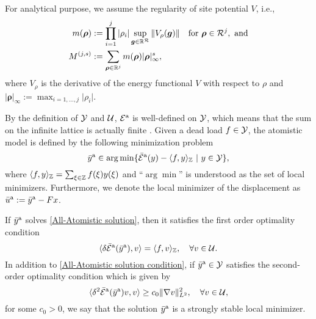 For analytical purpose, we assume the regularity of site potential $V$, i.e.,
\begin{align*}
		m(\bm{\rho})&:= \prod_{i =1}^{j} \vert \rho_{i} \vert \sup_{\bm{g} \in \mathbb{R}^{\mathcal{R}}} \Vert V_{\rho}(\bm{g}) \Vert \quad \text{for} \ \bm{\rho} \in \mathcal{R}^{j}, \ \text{and} \\
		M^{(j,s)}&:= \sum_{\bm{\rho} \in \mathbb{R}^{j} } m(\bm{\rho}) \vert \bm{\rho} \vert^{s}_{\infty},
\end{align*}
where $V_\rho$ is the derivative of the energy functional $V$ with respect to $\rho$ and $\vert \bm{\rho} \vert_{\infty}:=\max_{i= 1,\dots,j}\vert \rho_{i} \vert$.

By the definition of $\mathcal{Y}$ and $\mathcal{U}$, $\mathcal{E}^{{\rm a}}$ is well-defined on $\mathcal{Y}$, which means that the sum on the infinite lattice is actually finite \cite[Proposition 3.7]{2013_ML_CO_AC_Coupling_ACTANUM}. Given a dead load $f \in \mathcal{Y}$, the atomistic model is defined by the following minimization problem 
\begin{equation}\label{All-Atomistic solution}
	\bar{y}^{{\rm a}} \in \arg \min\{\bar{\mathcal{E}}^{{\rm a}}(y) -\langle f,y\rangle_{\mathbb{Z}}\ | \ y \in \mathcal{Y}\},
\end{equation}
where $\langle f,y\rangle_{\mathbb{Z}} = \sum_{\xi \in \mathbb{Z}} f(\xi)y(\xi)$ and ``$\arg\min$'' is understood as the set of local minimizers. Furthermore, we denote the local minimizer of the displacement as $\bar{u}^{\rm a}:=\bar{y}^{\rm a}-Fx$. 

If $\bar{y}^{{\rm a}}$ solves \eqref{All-Atomistic solution}, then it satisfies the first order optimality condition 
\begin{equation}\label{All-Atomistic solution condition}
	\langle \delta \bar{\mathcal{E}}^{{\rm a}}(\bar{y}^{{\rm a}}),v \rangle = \langle f,v\rangle_{\mathbb{Z}}, \quad \forall v \in \mathcal{U}.
\end{equation}
In addition to \eqref{All-Atomistic solution condition}, if $\bar{y}^{{\rm a}} \in \mathcal{Y}$ satisfies the second-order optimality condition which is given by
\begin{equation}\label{All-Atomistic strong local minimizer}
	\langle \delta^{2}\bar{\mathcal{E}}^{{\rm a}}(\bar{y}^{{\rm a}})v,v\rangle \ge c_{0} \Vert \nabla v \Vert^{2}_{L^{2}},  \quad \forall v\in \mathcal{U},
\end{equation}
for some $c_{0} >0$, we say that the solution $\bar{y}^{{\rm a}}$ is a strongly stable local minimizer.

	
